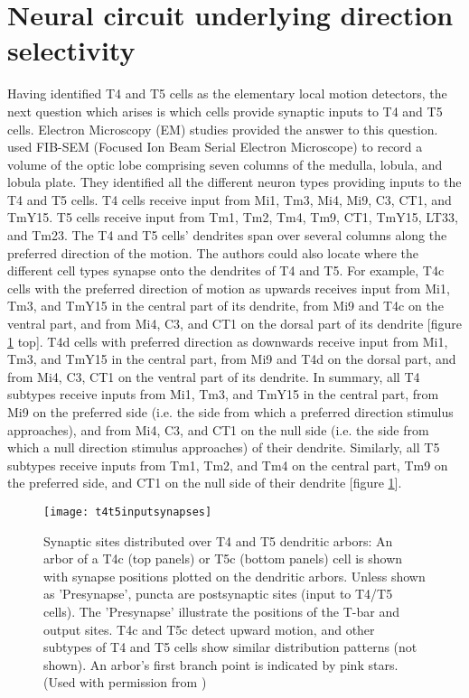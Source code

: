 \section{Neural circuit underlying direction selectivity}
Having identified T4 and T5 cells as the elementary local motion detectors, the next question which arises is which cells provide synaptic inputs to T4 and T5 cells. Electron Microscopy (EM) studies \parencite{Shinomiya2019, Takemura2017} provided the answer to this question. \cite{Shinomiya2019} used FIB-SEM (Focused Ion Beam Serial Electron Microscope) to record a volume of the optic lobe comprising seven columns of the medulla, lobula, and lobula plate. They identified all the different neuron types providing inputs to the T4 and T5 cells. T4 cells receive input from Mi1, Tm3, Mi4, Mi9, C3, CT1, and TmY15. T5 cells receive input from Tm1, Tm2, Tm4, Tm9, CT1, TmY15, LT33, and Tm23. The T4 and T5 cells' dendrites span over several columns along the preferred direction of the motion. The authors could also locate where the different cell types synapse onto the dendrites of T4 and T5. For example, T4c cells with the preferred direction of motion as upwards receives input from Mi1, Tm3, and TmY15 in the central part of its dendrite, from Mi9 and T4c on the ventral part, and from Mi4, C3, and CT1 on the dorsal part of its dendrite [figure \ref{fig:t4t5inputsynapses} top]. T4d cells with preferred direction as downwards receive input from Mi1, Tm3, and TmY15 in the central part, from Mi9 and T4d on the dorsal part, and from Mi4, C3, CT1 on the ventral part of its dendrite. In summary, all T4 subtypes receive inputs from Mi1, Tm3, and TmY15 in the central part, from Mi9 on the preferred side (i.e. the side from which a preferred direction stimulus approaches), and from Mi4, C3, and CT1 on the null side (i.e. the side from which a null direction stimulus approaches) of their dendrite. Similarly, all T5 subtypes receive inputs from Tm1, Tm2, and Tm4 on the central part, Tm9 on the preferred side, and CT1 on the null side of their dendrite [figure \ref{fig:t4t5inputsynapses}]. %

\begin{figure}
\centering
\hspace*{-1.4cm} 
\texttt{[image: t4t5inputsynapses]}
\caption[Synaptic sites distributed over T4 and T5 dendritic arbors]{Synaptic sites distributed over T4 and T5 dendritic arbors: An arbor of a T4c (top panels) or T5c (bottom panels) cell is shown with synapse positions plotted on the dendritic arbors. Unless shown as 'Presynapse', puncta are postsynaptic sites (input to T4/T5 cells). The 'Presynapse' illustrate the positions of the T-bar and output sites. T4c and T5c detect upward motion, and other subtypes of T4 and T5 cells show similar distribution patterns (not shown). An arbor's first branch point is indicated by pink stars. (Used with permission from \cite{Shinomiya2019})}
\label{fig:t4t5inputsynapses}
\end{figure}

